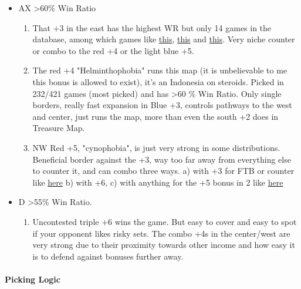 \begin{itemize}
    \item AX >60\% Win Ratio
    \begin{enumerate}
        \item That +3 in the east has the highest WR but only 14 games in the database, among which games like \href{https://www.warzone.com/MultiPlayer?GameID=38294064}{this}, \href{https://www.warzone.com/MultiPlayer?GameID=33334645}{this} and \href{https://www.warzone.com/MultiPlayer?GameID=32179178}{this}. Very niche counter or combo to the red +4 or the light blue +5.
        \item The red +4 "Helminthophobia" runs this map (it is unbelievable to me this bonus is allowed to exist), it's an Indonesia on steroids. Picked in 232/421 games (most picked) and has >60 \% Win Ratio. Only single borders, really fast expansion in Blue +3, controls pathways to the west and center, just runs the map, more than even the south +2 does in Treasure Map.
        \item NW Red +5, "cynophobia", is just very strong in some distributions. Beneficial border against the +3, way too far away from everything else to counter it, and can combo three ways. a) with +3 for FTB or counter like \href{https://www.warzone.com/MultiPlayer?GameID=38753471}{here} b) with +6, c) with anything for the +5 bonus in 2 like \href{https://www.warzone.com/MultiPlayer?GameID=38047164}{here}
    \end{enumerate}
    \item D >55\% Win Ratio.
    \begin{enumerate}
        \item Uncontested triple +6 wins the game. But easy to cover and easy to spot if your opponent likes risky sets. The combo +4s in the center/west are very strong due to their proximity towards other income and how easy it is to defend against bonuses further away.
    \end{enumerate}

\end{itemize}


\paragraph{Picking Logic}

